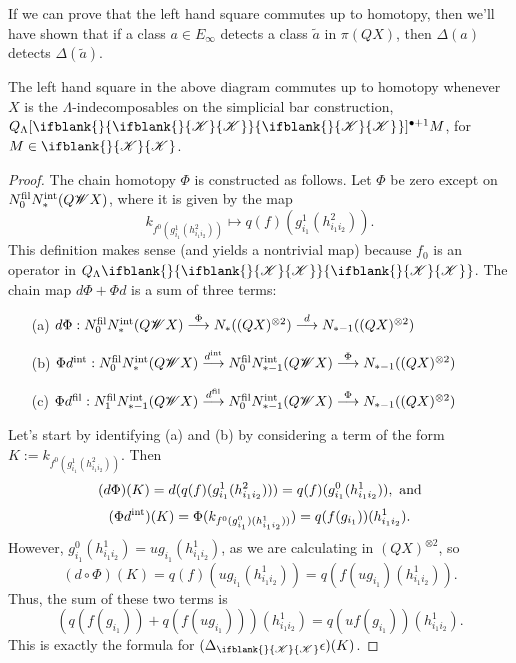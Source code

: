 \documentclass[10pt]{article}
\newcommand{\LL}[1]{\ifblank{#1}{\scrK}{\scrK^{#1}}}
\newcommand{\Fr}[2][]{\ifblank{#1}{#2}{#2_{#1}}}
\renewcommand{\Q}{Q}
\begin{document}
\begin{Grothendieck Multiplicativity}
If we can prove that the left hand square commutes up to homotopy, then we'll have shown that if a class $a\in E_{\infty}$ detects a class $\widetilde{a}$ in $\pi(QX)$, then $\Delta(a)$ detects $\Delta(\widetilde{a})$.
\begin{prop}
The left hand square in the above diagram commutes up to homotopy whenever $X$ is the $\Lambda$-indecomposables on the simplicial bar construction, $\Q_{\Lambda}[\Fr{\LL{}}]^{\bullet+1}M$, for $M\in\LL{}$.
\end{prop}
\begin{proof}
The chain homotopy $\Phi$ is constructed as follows. Let $\Phi$ be zero except on $N_0^\textup{fil}N_*^\textup{int}(Q\scrW X)$, where it is given by the map
\[k_{f^0(g^1_{i_1}(h^2_{i_1i_2}))}\mapsto q(f)(g^1_{i_1}(h^2_{i_1i_2})).\]
This definition makes sense (and yields a nontrivial map) because $f_0$ is an operator in $\Q_{\Lambda}\Fr{\LL{}}$.
The chain map $d\Phi+\Phi d$ is a sum of three terms:
\begin{enumerate}\squishlist
\setlength{\parindent}{.25in}
\item[(a)] $d\circ\Phi:N_0^\textup{fil}N_*^\textup{int}(Q\scrW X)\overset{\Phi}{\to} N_*((QX)^{\otimes2})\overset{d}{\to} N_{*-1}((QX)^{\otimes2})$
\item[(b)] $\Phi\circ d^\textup{int}:N_0^\textup{fil}N_{*}^\textup{int}(Q\scrW X)\overset{d^\textup{int}}{\to} N_0^\textup{fil}N_{*-1}^\textup{int}(Q\scrW X)\overset{\Phi}{\to} N_{*-1}((QX)^{\otimes2})$
\item[(c)] $\Phi\circ d^\textup{fil}:N_1^\textup{fil}N_{*-1}^\textup{int}(Q\scrW X)\overset{d^\textup{fil}}{\to} N_0^\textup{fil}N_{*-1}^\textup{int}(Q\scrW X)\overset{\Phi}{\to} N_{*-1}((QX)^{\otimes2})$
\end{enumerate}
Let's start by identifying (a) and (b) by considering a term of the form $K:=k_{f^0(g^1_{i_1}(h^2_{i_1i_2}))}$. Then
\[(d\circ\Phi)(K)=d( q(f)(g^1_{i_1}(h^2_{i_1i_2})))=q(f)(g^0_{i_1}(h^1_{i_1i_2})),\textup{ and}\]
\[(\Phi\circ d^\textup{int})(K)=\Phi( k_{f^0(g^0_{i_1})(h^1_{i_1i_2}))})=q(f(g_{i_1}))(h^1_{i_1i_2}).\]
However, $g^0_{i_1}(h^1_{i_1i_2})=ug_{i_1}(h^1_{i_1i_2})$, as we are calculating in $(QX)^{\otimes2}$, so
\[(d\circ\Phi)(K)=q(f)(ug_{i_1}(h^1_{i_1i_2}))=q(f(ug_{i_1})(h^1_{i_1i_2})).\]
Thus, the sum of these two terms is
\[\left(q(f(g_{i_1}))+q(f(ug_{i_1}))\right)(h^1_{i_1i_2})=q(uf(g_{i_1}))(h^1_{i_1i_2}).\]
This is exactly the formula for $(\Delta_{\LL{}}\circ\epsilon)(K)$.


\end{proof}
\end{Grothendieck Multiplicativity}
\end{document}
